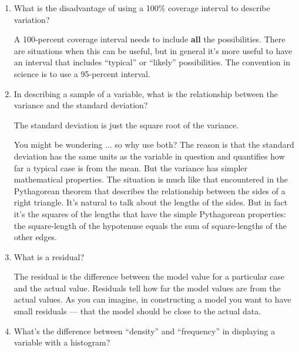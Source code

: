 


\begin{enumerate}
\item What is the disadvantage of using a 100\% coverage interval to
  describe variation? \TextEntry[itemname=100perc]

\begin{AnswerText}
A 100-percent coverage interval needs to include {\bf all} the
possibilities.  There are situations when this can be useful, but in
general it's more useful to have an interval that includes ``typical''
or ``likely'' possibilities.  The convention in science is to use a
95-percent interval.
\end{AnswerText}

\item In describing a sample of a variable, 
what is the relationship between the variance and the standard
  deviation?\TextEntry[itemname=relat]

\begin{AnswerText}
The standard deviation is just the square root of the variance.  

You might be wondering ... so why use both?  The reason is that the standard deviation has the same
units as the variable in question and quantifies how far a typical
case is from the mean.  But the variance has simpler
mathematical properties.  The situation is much like that encountered
in the Pythagorean theorem that describes the relationship between the
sides of a right triangle.  It's natural to talk about the lengths of
the sides.  But in fact it's the squares of the lengths that have the
simple Pythagorean properties: the square-length of the hypotenuse
equals the sum of square-lengths of the other edges.
\end{AnswerText}

\item What is a residual?\TextEntry[itemname=resid]

\begin{AnswerText}
The residual is the difference between the model value for a
particular case and the actual value.  Residuals tell how far the
model values are from the actual values.  As you can imagine, in
constructing a model you want to have small residuals --- that the
model should be close to the actual data.
\end{AnswerText}

\item What's the difference between ``density'' and ``frequency'' in
  displaying a variable with a histogram?\TextEntry[itemname=dens]


\end{enumerate}
